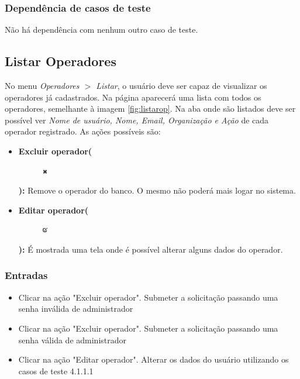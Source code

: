 \subsubsection{Dependência de casos de teste}
Não há dependência com nenhum outro caso de teste.

\subsection{Listar Operadores}

No menu \textit{Operadores $>$ Listar}, o usuário deve ser capaz de visualizar os operadores já cadastrados.
Na página aparecerá uma lista com todos os operadores, semelhante à imagem \ref{fig:listarop}.
Na aba onde são listados deve ser possível ver \textit{Nome de usuário, Nome, Email, Organização e Ação} de cada operador registrado. As ações possíveis são:

\begin{itemize}

	\item \textbf{Excluir operador(}\begin{figure} \includegraphics[height=10]{images/iconedelete2} \end{figure} \textbf{):} Remove o operador do banco. O mesmo não poderá mais logar no sistema.
	\item \textbf{Editar operador(}\begin{figure} \includegraphics[height=10]{images/iconeeditar} \end{figure} \textbf{):} É mostrada uma tela onde é possível alterar alguns dados do operador.
	
\end{itemize}

\subsubsection{Entradas}

\begin{itemize}

	\item Clicar na ação "Excluir operador". Submeter a solicitação passando uma senha inválida de administrador
	\item Clicar na ação "Excluir operador". Submeter a solicitação passando uma senha válida de administrador
	\item Clicar na ação "Editar operador". Alterar os dados do usuário utilizando os casos de teste 4.1.1.1
	
\end{itemize}

